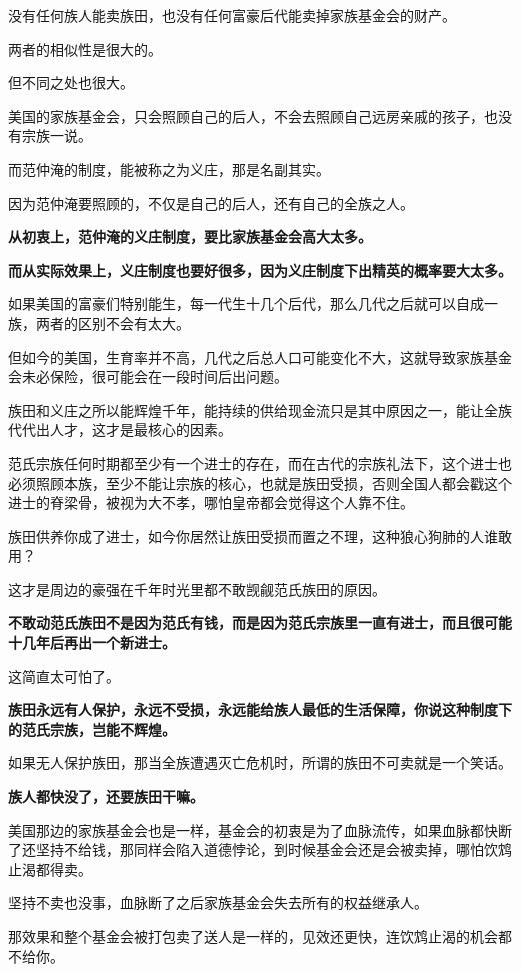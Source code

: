 \documentclass[UTF8, 11pt, oneside]{ctexart}
\newcommand{\zd}[1]{\textbf{\textcolor[RGB]{123,12,0}{#1}}} %
\begin{document}
没有任何族人能卖族田，也没有任何富豪后代能卖掉家族基金会的财产。

两者的相似性是很大的。

但不同之处也很大。

美国的家族基金会，只会照顾自己的后人，不会去照顾自己远房亲戚的孩子，也没有宗族一说。

而范仲淹的制度，能被称之为义庄，那是名副其实。

因为范仲淹要照顾的，不仅是自己的后人，还有自己的全族之人。

\zd{从初衷上，范仲淹的义庄制度，要比家族基金会高大太多。}

\zd{而从实际效果上，义庄制度也要好很多，因为义庄制度下出精英的概率要大太多。}

如果美国的富豪们特别能生，每一代生十几个后代，那么几代之后就可以自成一族，两者的区别不会有太大。

但如今的美国，生育率并不高，几代之后总人口可能变化不大，这就导致家族基金会未必保险，很可能会在一段时间后出问题。

族田和义庄之所以能辉煌千年，能持续的供给现金流只是其中原因之一，能让全族代代出人才，这才是最核心的因素。

范氏宗族任何时期都至少有一个进士的存在，而在古代的宗族礼法下，这个进士也必须照顾本族，至少不能让宗族的核心，也就是族田受损，否则全国人都会戳这个进士的脊梁骨，被视为大不孝，哪怕皇帝都会觉得这个人靠不住。

族田供养你成了进士，如今你居然让族田受损而置之不理，这种狼心狗肺的人谁敢用？

这才是周边的豪强在千年时光里都不敢觊觎范氏族田的原因。

\zd{不敢动范氏族田不是因为范氏有钱，而是因为范氏宗族里一直有进士，而且很可能十几年后再出一个新进士。}

这简直太可怕了。

\zd{族田永远有人保护，永远不受损，永远能给族人最低的生活保障，你说这种制度下的范氏宗族，岂能不辉煌。}

如果无人保护族田，那当全族遭遇灭亡危机时，所谓的族田不可卖就是一个笑话。

\zd{族人都快没了，还要族田干嘛。}

美国那边的家族基金会也是一样，基金会的初衷是为了血脉流传，如果血脉都快断了还坚持不给钱，那同样会陷入道德悖论，到时候基金会还是会被卖掉，哪怕饮鸩止渴都得卖。

坚持不卖也没事，血脉断了之后家族基金会失去所有的权益继承人。

那效果和整个基金会被打包卖了送人是一样的，见效还更快，连饮鸩止渴的机会都不给你。
\end{document}
